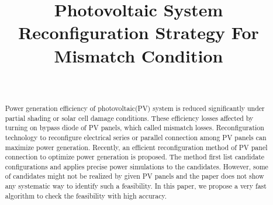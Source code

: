 \documentclass[conference]{IEEEtran}
\begin{document}
\title{Photovoltaic System Reconfiguration Strategy For Mismatch Condition\\
  {\footnotesize \textsuperscript{}}}

\author{
  }

 \author{
 \\
 \and
 }

\maketitle
\begin{abstract}
  Power generation efficiency of photovoltaic(PV) system is reduced significantly under partial shading or solar cell damage  conditions. These efficiency losses affected by turning on bypass diode of PV panels, which called mismatch losses. Reconfiguration technology to reconfigure electrical series or parallel connection among PV panels can maximize power generation. Recently, an efficient reconfiguration method of PV panel connection to optimize power generation is proposed. The method first list candidate configurations and applies precise power simulations to the candidates. However, some of candidates might not be realized by given PV panels and the paper does not show any systematic way to identify such a feasibility. In this paper, we propose a very fast algorithm to check the feasibility with high accuracy.
\end{abstract}
\end{document}
